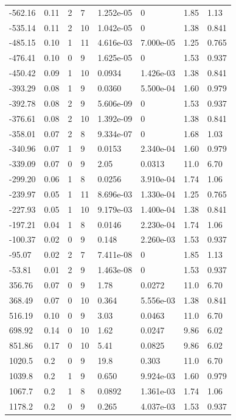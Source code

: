 \documentclass[preview]{standalone}
\begin{document}
{{\begin{tabular}{L{1.2cm}C{1.2cm} C{0.3cm}C{0.5cm} C{1.4cm}C{1.4cm} C{1.4cm}C{1.4cm}}
  -562.16  &  0.11  & 2     &  7 &  1.252e-05  & 0  & 1.85 &  1.13   \\ 
  -535.14  &  0.11  & 2     & 10 &  1.042e-05  & 0  & 1.38 &  0.841   \\ 
  -485.15  &  0.10  & 1     & 11 &  4.616e-03  & 7.000e-05  & 1.25 &  0.765   \\ 
  -476.41  &  0.10  & 0     &  9 &  1.625e-05  & 0  & 1.53 &  0.937   \\ 
  -450.42  &  0.09  & 1     & 10 &  0.0934  & 1.426e-03  & 1.38 &  0.841   \\ 
  -393.29  &  0.08  & 1     &  9 &  0.0360  & 5.500e-04  & 1.60 &  0.979   \\ 
  -392.78  &  0.08  & 2     &  9 &  5.606e-09  & 0  & 1.53 &  0.937   \\ 
  -376.61  &  0.08  & 2     & 10 &  1.392e-09  & 0  & 1.38 &  0.841   \\ 
  -358.01  &  0.07  & 2     &  8 &  9.334e-07  & 0  & 1.68 &  1.03   \\ 
  -340.96  &  0.07  & 1     &  9 &  0.0153  & 2.340e-04  & 1.60 &  0.979   \\ 
  -339.09  &  0.07  & 0     &  9 &  2.05  & 0.0313  & 11.0 &  6.70   \\ 
  -299.20  &  0.06  & 1     &  8 &  0.0256  & 3.910e-04  & 1.74 &  1.06   \\ 
  -239.97  &  0.05  & 1     & 11 &  8.696e-03  & 1.330e-04  & 1.25 &  0.765   \\ 
  -227.93  &  0.05  & 1     & 10 &  9.179e-03  & 1.400e-04  & 1.38 &  0.841   \\ 
  -197.21  &  0.04  & 1     &  8 &  0.0146  & 2.230e-04  & 1.74 &  1.06   \\ 
  -100.37  &  0.02  & 0     &  9 &  0.148  & 2.260e-03  & 1.53 &  0.937   \\ 
  -95.07  &  0.02  & 2     &  7 &  7.411e-08  & 0  & 1.85 &  1.13   \\ 
  -53.81  &  0.01  & 2     &  9 &  1.463e-08  & 0  & 1.53 &  0.937   \\ 
  356.76  &  0.07  & 0     &  9 &  1.78  & 0.0272  & 11.0 &  6.70   \\ 
  368.49  &  0.07  & 0     & 10 &  0.364  & 5.556e-03  & 1.38 &  0.841   \\ 
  516.19  &  0.10  & 0     &  9 &  3.03  & 0.0463  & 11.0 &  6.70   \\ 
  698.92  &  0.14  & 0     & 10 &  1.62  & 0.0247  & 9.86 &  6.02   \\ 
  851.86  &  0.17  & 0     & 10 &  5.41  & 0.0825  & 9.86 &  6.02   \\ 
  1020.5  &   0.2  & 0     &  9 &  19.8  & 0.303  & 11.0 &  6.70   \\ 
  1039.8  &   0.2  & 1     &  9 &  0.650  & 9.924e-03  & 1.60 &  0.979   \\ 
  1067.7  &   0.2  & 1     &  8 &  0.0892  & 1.361e-03  & 1.74 &  1.06   \\ 
  1178.2  &   0.2  & 0     &  9 &  0.265  & 4.037e-03  & 1.53 &  0.937   \\ 
\hline 
\end{tabular} 

}}
\end{document}
